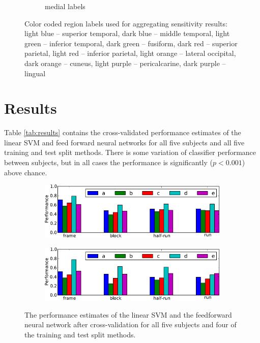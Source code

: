 \documentclass[preprint,5p,authoryear]{elsarticle}
\begin{document}
\begin{figure}
\begin{subfigure}{0.3\textwidth}
\caption{medial labels}
\label{fig:medial-labels}
\end{subfigure}
\caption{Color coded region labels used for aggregating sensitivity results: light blue -- superior temporal, dark blue -- middle temporal, light green -- inferior temporal, dark green -- fusiform, dark red -- superior parietal, light red -- inferior parietal, light orange -- lateral occipital, dark orange -- cuneus, light purple -- pericalcarine, dark purple -- lingual}
\end{figure}

\section{Results}
Table \ref{tab:results} contains the cross-validated performance estimates of the linear SVM and feed forward neural networks for all five subjects and all five training and test split methods.
There is some variation of classifier performance between subjects, but in all cases the performance is significantly ($p < 0.001$) above chance. 

\begin{figure}
\centering
\begin{subfigure}{0.8\textwidth}
\centering
\includegraphics[width=\textwidth]{figures/svm-performance-graph}
\caption{}
\label{fig:svm-performance-graph}
\end{subfigure}
\begin{subfigure}{0.8\textwidth}
\centering
\includegraphics[width=\textwidth]{figures/nn-performance-graph}
\caption{}
\label{fig:nn-performance-graph}
\end{subfigure}
\caption{The performance estimates of the  linear SVM and the  feedforward neural network after cross-validation for all five subjects and four of the training and test split methods. }
\end{figure}
\end{document}
